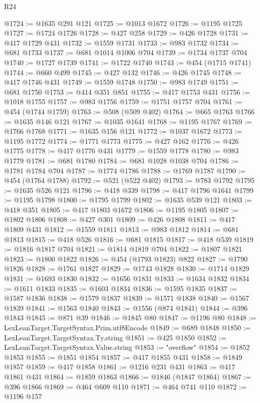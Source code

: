 \begin{lexlean}{R24}
\begin{coremodule}
@1724 := @1635 @291 @121
@1725 := @1013 @1672
@1726 := @1195 @1725
@1727 := @1724 @1726
@1728 := @427 @258
@1729 := @426 @1728
@1731 := @417 @1729 @431
@1732 := @1559 @1731
@1733 := @983 @1732
@1734 := @681 @1733
@1737 := @681 @1014 @1006 @704
@1739 := @1734 @1737 @704
@1740 := @1727 @1739
@1741 := @1722 @1740
@1743 := @454 (@1715 @1741)
@1744 := @660 @499
@1745 := @427 @132
@1746 := @426 @1745
@1748 := @417 @1746 @431
@1749 := @1559 @1748
@1750 := @983 @1749
@1751 := @681 @1750
@1753 := @414 @351 @851
@1755 := @417 @1753 @431
@1756 := @1018 @1755
@1757 := @983 @1756
@1759 := @1751 @1757 @704
@1761 := @454 (@1744 @1759)
@1763 := @508 (@509 @402)
@1764 := @665 @1763
@1766 := @1635 @146 @121
@1767 := @1035 @1641
@1768 := @1195 @1767
@1769 := @1766 @1768
@1771 := @1635 @156 @121
@1772 := @1037 @1672
@1773 := @1195 @1772
@1774 := @1771 @1773
@1775 := @427 @162
@1776 := @426 @1775
@1778 := @417 @1776 @431
@1779 := @1559 @1778
@1780 := @983 @1779
@1781 := @681 @1780
@1784 := @681 @1028 @1038 @704
@1786 := @1781 @1784 @704
@1787 := @1774 @1786
@1788 := @1769 @1787
@1790 := @454 (@1764 @1788)
@1792 := @521 (@522 @402)
@1793 := @783 @1792
@1795 := @1635 @526 @121
@1796 := @418 @339
@1798 := @417 @1796 @1641
@1799 := @1195 @1798
@1800 := @1795 @1799
@1802 := @1635 @539 @121
@1803 := @418 @351
@1805 := @417 @1803 @1672
@1806 := @1195 @1805
@1807 := @1802 @1806
@1808 := @427 @301
@1809 := @426 @1808
@1811 := @417 @1809 @431
@1812 := @1559 @1811
@1813 := @983 @1812
@1814 := @681 @1813
@1815 := @418 @526
@1816 := @681 @1815
@1817 := @418 @539
@1819 := @1816 @1817 @704
@1821 := @1814 @1819 @704
@1822 := @1807 @1821
@1823 := @1800 @1822
@1826 := @454 (@1793 @1823) @822
@1827 := @1790 @1826
@1828 := @1761 @1827
@1829 := @1743 @1828
@1830 := @1714 @1829
@1831 := @1693 @1830
@1832 := @1656 @1831
@1833 := @1634 @1832
@1834 := @1611 @1833
@1835 := @1603 @1834
@1836 := @1595 @1835
@1837 := @1587 @1836
@1838 := @1579 @1837
@1839 := @1571 @1838
@1840 := @1567 @1839
@1841 := @1563 @1840
@1843 := @1556 (@874 @1841)
@1844 := @396 @1843
@1845 := @871 @39
@1846 := @1845 @80
@1847 := @1196 @80
@1848 := LexLeanTarget.TargetSyntax.Prim.utf8Encode
@1849 := @689 @1848
@1850 := LexLeanTarget.TargetSyntax.Ty.string
@1851 := @425 @1850
@1852 := LexLeanTarget.TargetSyntax.Value.string
@1853 := "overflow"
@1854 := @1852 @1853
@1855 := @1851 @1854
@1857 := @417 @1855 @431
@1858 := @1849 @1857
@1859 := @417 @1858
@1861 := @1216 @231 @431
@1863 := @417 @1861 @431
@1864 := @1859 @1863
@1866 := @1846 (@1847 @1864)
@1867 := @396 @1866
@1869 := @464 @609 @110
@1871 := @464 @741 @110
@1872 := @1196 @157

\end{coremodule}
\end{lexlean}
